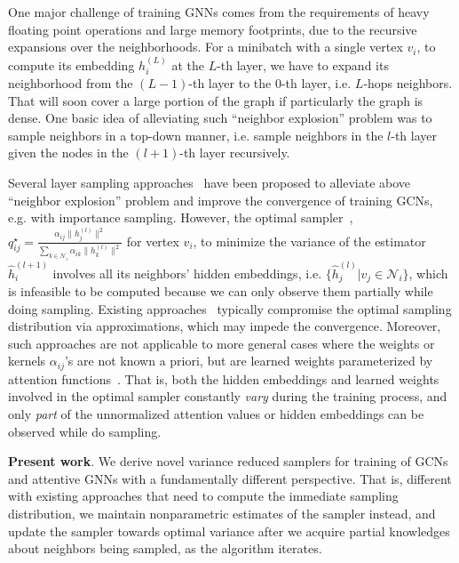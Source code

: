 \documentclass{article}
\begin{document}
One major challenge of training GNNs comes from
the requirements of heavy floating point operations and 
large memory footprints, due to the recursive
expansions over the neighborhoods.
For a minibatch with a single vertex $v_i$, 
to compute its embedding $h_i^{(L)}$ at 
the $L$-th layer, we have to expand
its neighborhood from the $(L-1)$-th layer to
the $0$-th layer, i.e. $L$-hops neighbors. That will
soon cover a large portion of the
graph if particularly the graph is dense.
One basic idea of alleviating such ``neighbor explosion'' problem
was to sample neighbors in a top-down
manner, i.e. sample neighbors in the 
$l$-th layer given the nodes in the 
$(l+1)$-th layer recursively.

Several layer sampling 
approaches~\cite{hamilton2017inductive,chen2018fastgcn,huang2018adaptive,zou2019layer} 
have been proposed to alleviate above 
``neighbor explosion'' problem and improve the 
convergence of training GCNs, e.g. with importance
sampling. 
However, the optimal sampler~\cite{huang2018adaptive}, 
$q_{ij}^{\star} = \frac{\alpha_{ij}\|h_j^{(l)}\|^2}
{\sum_{k \in \mathcal{N}_i} \alpha_{ik} \|h_k^{(l)}\|^2}$ 
for vertex $v_i$,
to minimize the variance of the estimator $\hat{h}_i^{(l+1)}$ 
involves all its neighbors' hidden 
embeddings, i.e. $\{\hat{h}_j^{(l)} | v_j \in \mathcal{N}_i \}$, 
which is infeasible to be computed because we can only observe
them partially while doing sampling. Existing 
approaches~\cite{chen2018fastgcn,huang2018adaptive,zou2019layer}
typically compromise the optimal sampling distribution via approximations,
which may impede the convergence. Moreover, such approaches are 
not applicable to more general cases
where the weights or kernels $\alpha_{ij}$'s are not known a priori,
but are learned weights parameterized by 
attention functions~\cite{velivckovic2017graph}. 
That is, both the hidden embeddings and learned weights
involved in the optimal sampler constantly
\emph{vary} during the training process, and only \emph{part} of 
the unnormalized attention values or hidden embeddings
can be observed while do sampling.

{\bfseries Present work}. We derive novel variance reduced 
samplers for training of GCNs and attentive GNNs with a 
fundamentally different perspective. That is, different 
with existing approaches that need to compute the 
immediate sampling distribution, 
we maintain nonparametric estimates
of the sampler instead, and update the 
sampler towards optimal variance after we 
acquire partial knowledges 
about neighbors being sampled, as the algorithm
iterates.
\end{document}
